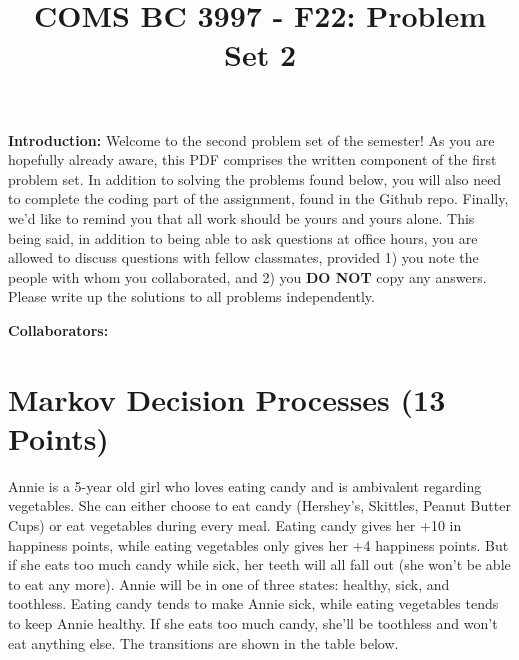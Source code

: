 \documentclass[]{article}
\title{COMS BC 3997 - F22: Problem Set 2}
\author{
}
\date{}
\begin{document}
\maketitle %

\textbf{Introduction:}  
Welcome to the second problem set of the semester!  As you are hopefully already aware, this PDF comprises the written component of the first problem set.  In addition to solving the problems found below, you will also need to complete the coding part of the assignment, found in the Github repo. Finally, we'd like to remind you that all work should be yours and yours alone. This being said, in addition to being able to ask questions at office hours, you are allowed to discuss questions with fellow classmates, provided 1) you note the people with whom you collaborated, and 2) you \textbf{DO NOT} copy any answers. Please write up the solutions to all problems independently.

\bigskip
\textbf{Collaborators:}
\clearpage

\section{Markov Decision Processes (13 Points)}
Annie is a 5-year old girl who loves eating candy and is ambivalent regarding vegetables. She can either choose to eat candy (Hershey's, Skittles, Peanut Butter Cups) or eat vegetables during every meal. Eating candy gives her +10 in happiness points, while eating vegetables only gives her +4 happiness points. But if she eats too much candy while sick, her teeth will all fall out (she won't be able to eat any more). Annie will be in one of three states: healthy, sick, and toothless. Eating candy tends to make Annie sick, while eating vegetables tends to keep Annie healthy. If she eats too much candy, she'll be toothless and won't eat anything else. The transitions are shown in the table below.
\end{document}
